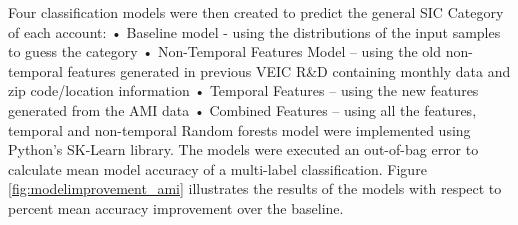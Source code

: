 Four classification models were then created to predict the general SIC Category of each account:
•	Baseline model - using the distributions of the input samples to guess the category
•	Non-Temporal Features Model – using the old non-temporal features generated in previous VEIC R&D containing monthly data and zip code/location information
•	Temporal Features – using the new features generated from the AMI data
•	Combined Features – using all the features, temporal and non-temporal
Random forests model were implemented using Python’s SK-Learn library. The models were executed an out-of-bag error to calculate mean model accuracy of a multi-label classification. Figure \ref{fig:modelimprovement_ami} illustrates the results of the models with respect to percent mean accuracy improvement over the baseline.
